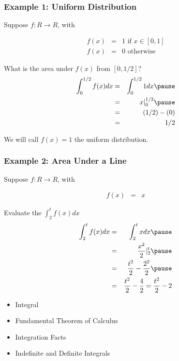 \documentclass[handout]{beamer}
\numberwithin{equation}{section}
\begin{document}
\begin{frame}
\frametitle{Example 1: Uniform Distribution}

Suppose $f: R \rightarrow R$, with 

\begin{eqnarray}
f(x) & =&  1 \text{ if  } x \in [0,1] \nonumber \\
f(x) & = & 0 \text{ otherwise } \nonumber
\end{eqnarray}
\pause 

What is the area under $f(x)$ from $[0, 1/2]$? \pause \\
\begin{eqnarray}
\int_{0}^{1/2}  f(x)dx & = & \int_{0}^{1/2} 1 dx \nonumber  \pause \\
							& = & x|_{0}^{1/2} \nonumber  \pause \\
							& = & (1/2) - (0 ) \nonumber \\
							& = & 1/2 \nonumber 
\end{eqnarray}
\pause 

We will call $f(x) = 1$ the uniform distribution.   

\end{frame}

\begin{frame}
\frametitle{Example 2: Area Under a Line} 

Suppose $f: R \rightarrow R$, with 

\begin{eqnarray}
f(x) & = & x \nonumber 
\end{eqnarray}

\pause 

Evaluate the $\int_{2}^{t}f(x)dx$  \pause 
\begin{eqnarray}
\int_{2}^{t}f(x)dx & = & \int_{2}^{t} x dx \nonumber  \pause \\
						& = & \frac{x^{2} }{2} |_{2}^{t} \nonumber  \pause  \\
						& = & \frac{t^2}{2} - \frac{2^2}{2} \nonumber  \pause \\
						& = & \frac{t^2}{2} - \frac{4}{2} = \frac{t^2}{2} - 2 \nonumber 
\end{eqnarray}						

\end{frame}



\begin{frame}

\begin{itemize}
\item \textcolor{mygray}{Integral}
\item \textcolor{mygray}{Fundamental Theorem of Calculus}
\item \textcolor{myblack}{Integration Facts}
\item \textcolor{mygray}{Indefinite and Definite Integrals}
\end{itemize}

\end{frame}
\end{document}
